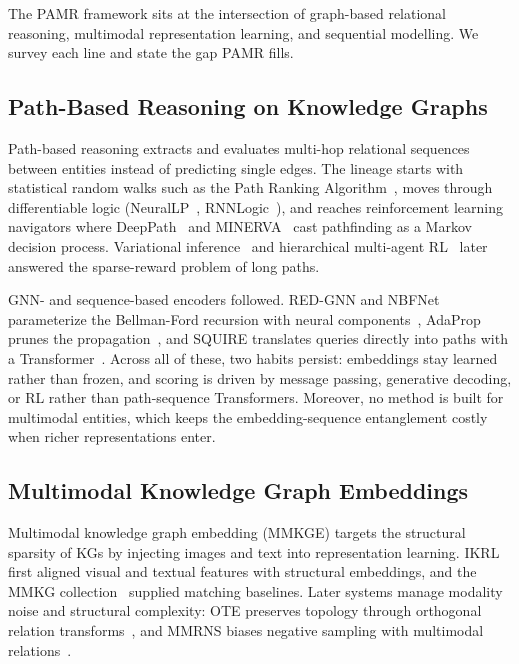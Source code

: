 \documentclass[runningheads]{llncs}
\begin{document}
The PAMR framework sits at the intersection of graph-based relational reasoning, multimodal representation learning, and sequential modelling. We survey each line and state the gap PAMR fills.

\subsection{Path-Based Reasoning on Knowledge Graphs}
\label{sec:rw-path-reasoning}

Path-based reasoning extracts and evaluates multi-hop relational sequences between entities instead of predicting single edges. The lineage starts with statistical random walks such as the Path Ranking Algorithm~\cite{lao2011random}, moves through differentiable logic (NeuralLP~\cite{yang2017differentiable}, RNNLogic~\cite{qu2021rnnlogic}), and reaches reinforcement learning navigators where DeepPath~\cite{xiong2017deeppath} and MINERVA~\cite{das2018go} cast pathfinding as a Markov decision process. Variational inference~\cite{chen2018variational} and hierarchical multi-agent RL~\cite{zhang2022learning} later answered the sparse-reward problem of long paths.

GNN- and sequence-based encoders followed. RED-GNN and NBFNet parameterize the Bellman-Ford recursion with neural components~\cite{zhang2022knowledge,zhu2021neural}, AdaProp prunes the propagation~\cite{zhang2023adaprop}, and SQUIRE translates queries directly into paths with a Transformer~\cite{bai2022squire}. Across all of these, two habits persist: embeddings stay learned rather than frozen, and scoring is driven by message passing, generative decoding, or RL rather than path-sequence Transformers. Moreover, no method is built for multimodal entities, which keeps the embedding-sequence entanglement costly when richer representations enter.

\subsection{Multimodal Knowledge Graph Embeddings}
\label{sec:rw-mmkge}

Multimodal knowledge graph embedding (MMKGE) targets the structural sparsity of KGs
by injecting images and text into representation learning. IKRL~\cite{xie2017image}
first aligned visual and textual features with structural embeddings, and the MMKG collection~\cite{liu2019mmkg} supplied matching baselines. Later systems manage
modality noise and structural complexity: OTE preserves topology through orthogonal
relation transforms~\cite{tang2020orthogonal}, and MMRNS biases negative sampling with
multimodal relations~\cite{xu2022multimodal}.
\end{document}
